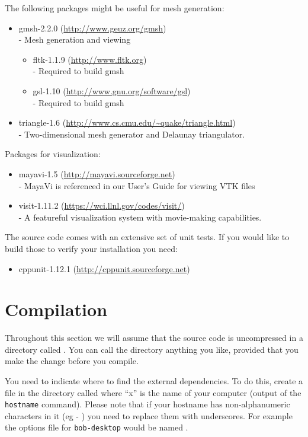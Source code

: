 The following packages might be useful for mesh generation:
\begin{itemize}
 \item gmsh-2.2.0 (\url{http://www.geuz.org/gmsh}) \\-
        Mesh generation and viewing
  \begin{itemize}
   \item fltk-1.1.9 (\url{http://www.fltk.org}) \\-
        Required to build gmsh 
   \item gsl-1.10 (\url{http://www.gnu.org/software/gsl}) \\-
        Required to build gmsh 
  \end{itemize}
 \item triangle-1.6 (\url{http://www.cs.cmu.edu/~quake/triangle.html}) \\-
        Two-dimensional mesh generator and Delaunay triangulator.
\end{itemize}

Packages for visualization:
\begin{itemize}
 \item mayavi-1.5 (\url{http://mayavi.sourceforge.net}) \\-
        MayaVi is referenced in our User's Guide for viewing VTK files
 \item visit-1.11.2 (\url{https://wci.llnl.gov/codes/visit/}) \\-
        A featureful visualization system with movie-making capabilities.
\end{itemize}

The source code comes with an extensive set of unit tests. If you would like to
build those to verify your installation you need:
\begin{itemize}
 \item cppunit-1.12.1 (\url{http://cppunit.sourceforge.net})
\end{itemize}

\section{Compilation}\label{sec:compilesrc}
Throughout this section we will assume that the source code is uncompressed in a directory called .
You can call the directory anything you like, provided that you make the change before you compile.

You need to indicate where to find the external dependencies.
To do this, create a file in the  directory called  where ``x'' is the name of your computer (output of the \texttt{hostname} command).
Please note that if your hostname has non-alphanumeric characters in it (eg - ) you need to replace them with underscores.
For example the options file for \texttt{bob-desktop} would be named .

